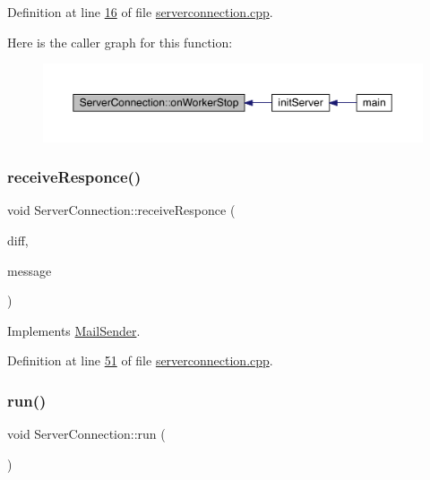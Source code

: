 Definition at line \hyperlink{a00101_source_l00016}{16} of file \hyperlink{a00101_source}{serverconnection.\+cpp}.

Here is the caller graph for this function\+:
\nopagebreak
\begin{figure}[H]
\begin{center}
\leavevmode
\includegraphics[width=350pt]{d8/d64/a00181_af558fe509b60eb019281316513f6d188_icgraph}
\end{center}
\end{figure}
\mbox{\label{a00181_afd1dd14f38c6c1d1efa719af1a9d9851}} 
\subsubsection{\texorpdfstring{receive\+Responce()}{receiveResponce()}}
{\footnotesize\ttfamily void Server\+Connection\+::receive\+Responce (\begin{DoxyParamCaption}\item[{Q\+List$<$ \hyperlink{a00141}{Diff\+Element} $\ast$$>$ $\ast$}]{diff,  }\item[{\hyperlink{a00121}{Message\+For\+Server} $\ast$}]{message }\end{DoxyParamCaption})\hspace{0.3cm}{\ttfamily [virtual]}}



Implements \hyperlink{a00205_aba34437231a62861737e97d50f85e7e8}{Mail\+Sender}.



Definition at line \hyperlink{a00101_source_l00051}{51} of file \hyperlink{a00101_source}{serverconnection.\+cpp}.

\mbox{\label{a00181_ac7f219a30789e91afa079ab5e49529bd}} 
\subsubsection{\texorpdfstring{run()}{run()}}
{\footnotesize\ttfamily void Server\+Connection\+::run (\begin{DoxyParamCaption}{ }\end{DoxyParamCaption})\hspace{0.3cm}{\ttfamily [protected]}}




